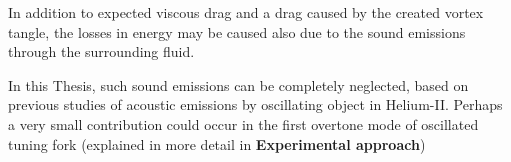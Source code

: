 In addition to expected viscous drag and a drag caused by the created vortex tangle, the losses in energy may be caused also due to the sound emissions through the surrounding fluid.

In this Thesis, such sound emissions can be completely neglected, based on previous studies \cite{emission} \cite{fork-exp} of acoustic emissions by oscillating object in Helium-II. Perhaps a very small contribution could occur in the first overtone mode of oscillated tuning fork (explained in more detail in \textbf{Experimental approach})

%

